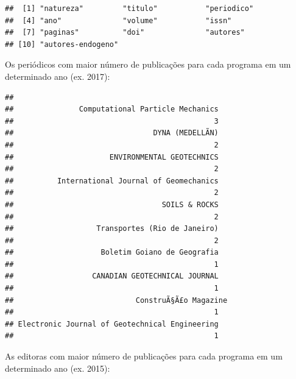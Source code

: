 \documentclass[]{article}
\newenvironment{Shaded}{\begin{snugshade}}{\end{snugshade}}
\newcommand{\DataTypeTok}[1]{\textcolor[rgb]{0.13,0.29,0.53}{#1}}
\newcommand{\DecValTok}[1]{\textcolor[rgb]{0.00,0.00,0.81}{#1}}
\newcommand{\KeywordTok}[1]{\textcolor[rgb]{0.13,0.29,0.53}{\textbf{#1}}}
\newcommand{\NormalTok}[1]{#1}
\newcommand{\OperatorTok}[1]{\textcolor[rgb]{0.81,0.36,0.00}{\textbf{#1}}}
\newcommand{\OtherTok}[1]{\textcolor[rgb]{0.56,0.35,0.01}{#1}}
\newcommand{\StringTok}[1]{\textcolor[rgb]{0.31,0.60,0.02}{#1}}
\begin{document}
\begin{verbatim}
##  [1] "natureza"         "titulo"           "periodico"       
##  [4] "ano"              "volume"           "issn"            
##  [7] "paginas"          "doi"              "autores"         
## [10] "autores-endogeno"
\end{verbatim}

Os periódicos com maior número de publicações para cada programa em um
determinado ano (ex. 2017):

\begin{Shaded}
\end{Shaded}

\begin{verbatim}
## 
##               Computational Particle Mechanics 
##                                              3 
##                                DYNA (MEDELLÃN) 
##                                              2 
##                      ENVIRONMENTAL GEOTECHNICS 
##                                              2 
##          International Journal of Geomechanics 
##                                              2 
##                                  SOILS & ROCKS 
##                                              2 
##                   Transportes (Rio de Janeiro) 
##                                              2 
##                    Boletim Goiano de Geografia 
##                                              1 
##                  CANADIAN GEOTECHNICAL JOURNAL 
##                                              1 
##                            ConstruÃ§Ã£o Magazine 
##                                              1 
## Electronic Journal of Geotechnical Engineering 
##                                              1
\end{verbatim}

As editoras com maior número de publicações para cada programa em um
determinado ano (ex. 2015):

\begin{Shaded}
\end{Shaded}
\end{document}

